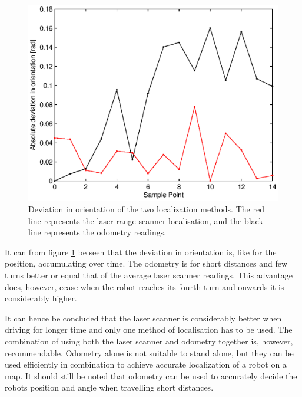 \begin{figure}[H]
\centering
\includegraphics[width = 13cm]{graphics/deviation_angle_encoderVSscanner}
\caption[Deviation in orientation of the two localization methods.]{Deviation in orientation of the two localization methods. The red line represents the laser range scanner localisation, and the black line represents the odometry readings.}
\label{fig:deviationOfEncoderVSScannerAngle}
\end{figure}

It can from figure \ref{fig:deviationOfEncoderVSScannerAngle} be seen that the deviation in orientation is, like for the position, accumulating over time. 
The odometry is for short distances and few turns better or equal that of the average laser scanner readings. This advantage does, however, cease when the robot reaches its fourth turn and onwards it is considerably higher.

It can hence be concluded that the laser scanner is considerably better when driving for longer time and only one method of localisation has to be used.
The combination of using both the laser scanner and odometry together is, however, recommendable.
Odometry alone is not suitable to stand alone, but they can be used efficiently in combination to achieve accurate localization of a robot on a map.
It should still be noted that odometry can be used to accurately decide the robots position and angle when travelling short distances.
